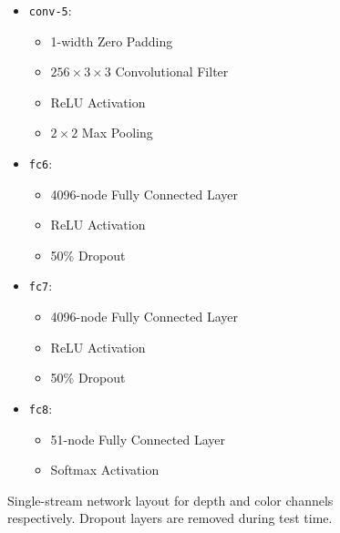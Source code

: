 \begin{figure}
\begin{mdframed}
\begin{itemize}
\begin{itemize}
    \end{itemize}
    \item \texttt{conv-5}:
    \begin{itemize}
        \item 1-width Zero Padding
        \item $256 \times 3 \times 3$ Convolutional Filter
        \item ReLU Activation
        \item $2 \times 2$ Max Pooling
    \end{itemize}
    \item \texttt{fc6}:
    \begin{itemize}
        \item 4096-node Fully Connected Layer
        \item ReLU Activation
        \item 50\% Dropout
    \end{itemize}
    \item \texttt{fc7}:
    \begin{itemize}
        \item 4096-node Fully Connected Layer
        \item ReLU Activation
        \item 50\% Dropout
    \end{itemize}
    \item \texttt{fc8}:
    \begin{itemize}
        \item 51-node Fully Connected Layer
        \item Softmax Activation
    \end{itemize}
\end{itemize}
\end{mdframed}
\caption{Single-stream network layout for depth and color channels respectively. Dropout layers are removed during test time.}
\label{fig:single_stream_layout}
\end{figure}


